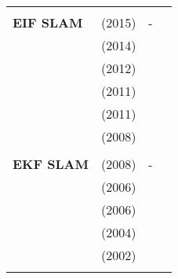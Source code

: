 \documentclass[a4paper,12pt]{scrartcl}
\begin{document}
{\begin{longtable}{l|l|l|l}
                           &                                   &                                                                    &                       \\
    \textbf{EIF SLAM}      & \cite{Samsuri2015} (2015)         & -                                                                  &                       \\
                           & \cite{Sola2014} (2014)            &                                                                    &                       \\
                           & \cite{Kurt-Yavuz2012} (2012)      &                                                                    &                       \\
                           & \cite{He2011} (2011)              &                                                                    &                       \\
                           & \cite{AuatCheein2011} (2011)      &                                                                    &                       \\
                           & \cite{Zhou2008} (2008)            &                                                                    &                       \\
                           &                                   &                                                                    &                       \\
    \textbf{EKF SLAM}      & \cite{Paz2008} (2008)             & -                                                                  &                       \\
                           & \cite{Bailey2006} (2006)          &                                                                    &                       \\
                           & \cite{Bailey2006a} (2006)         &                                                                    &                       \\
                           & \cite{Riisgaard2004} (2004)       &                                                                    &                       \\
                           & \cite{Thrun1999} (2002)           &                                                                    &                       \\
                           &                                   &                                                                    &                       \\

\end{longtable}}
\end{document}
